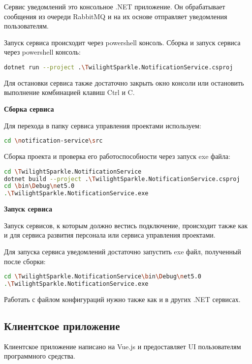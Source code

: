 Сервис уведомлений это консольное .NET приложение. Он обрабатывает сообщения из очереди RabbitMQ и на их основе отправляет уведомления пользователям.

Запуск сервиса происходит через powershell консоль. Сборка и запуск сервиса через powershell консоль:

\begin{lstlisting}[language=bash]
dotnet run --project .\TwilightSparkle.NotificationService.csproj
\end{lstlisting}

Для остановки сервиса также достаточно закрыть окно консоли или остановить выполнение комбинацией клавиш Ctrl и C.

\bigskip
\textbf{Сборка сервиса}

Для перехода в папку сервиса управления проектами используем:

\begin{lstlisting}[language=bash]
cd \notification-service\src
\end{lstlisting}

Сборка проекта и проверка его работоспособности через запуск exe файла:

\begin{lstlisting}[language=bash]
cd \TwilightSparkle.NotificationService
dotnet build --project .\TwilightSparkle.NotificationService.csproj
cd \bin\Debug\net5.0
.\TwilightSparkle.NotificationService.exe
\end{lstlisting}

\bigskip
\textbf{Запуск сервиса}

Запуск сервисов, к которым должно вестись подключение, происходит также как и для сервиса развития персонала или сервиса управления проектами.

Для запуска сервиса уведомлений достаточно запустить exe файл, полученный после сборки:

\begin{lstlisting}[language=bash]
cd \TwilightSparkle.NotificationService\bin\Debug\net5.0
.\TwilightSparkle.NotificationService.exe
\end{lstlisting}

Работать с файлом конфигураций нужно также как и в других .NET сервисах.


\subsection{Клиентское приложение}

Клиентское приложение написано на Vue.js и предоставляет UI пользователям программного средства.


